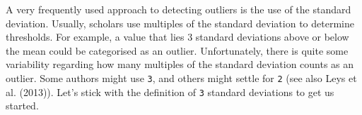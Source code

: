 \documentclass[
  letterpaper,
  DIV=11,
  numbers=noendperiod]{scrreprt}
\newenvironment{Shaded}{\begin{snugshade}}{\end{snugshade}}
\newcommand{\AttributeTok}[1]{\textcolor[rgb]{0.40,0.45,0.13}{#1}}
\newcommand{\CommentTok}[1]{\textcolor[rgb]{0.37,0.37,0.37}{#1}}
\newcommand{\ConstantTok}[1]{\textcolor[rgb]{0.56,0.35,0.01}{#1}}
\newcommand{\DecValTok}[1]{\textcolor[rgb]{0.68,0.00,0.00}{#1}}
\newcommand{\FunctionTok}[1]{\textcolor[rgb]{0.28,0.35,0.67}{#1}}
\newcommand{\NormalTok}[1]{\textcolor[rgb]{0.00,0.23,0.31}{#1}}
\newcommand{\OtherTok}[1]{\textcolor[rgb]{0.00,0.23,0.31}{#1}}
\newcommand{\SpecialCharTok}[1]{\textcolor[rgb]{0.37,0.37,0.37}{#1}}
\newcommand{\StringTok}[1]{\textcolor[rgb]{0.13,0.47,0.30}{#1}}
\begin{document}
A very frequently used approach to detecting outliers is the use of the
standard deviation. Usually, scholars use multiples of the standard
deviation to determine thresholds. For example, a value that lies 3
standard deviations above or below the mean could be categorised as an
outlier. Unfortunately, there is quite some variability regarding how
many multiples of the standard deviation counts as an outlier. Some
authors might use \texttt{3}, and others might settle for \texttt{2}
(see also Leys et al. (2013)). Let's stick with the definition of
\texttt{3} standard deviations to get us started.

\begin{Shaded}
\end{Shaded}
\end{document}
